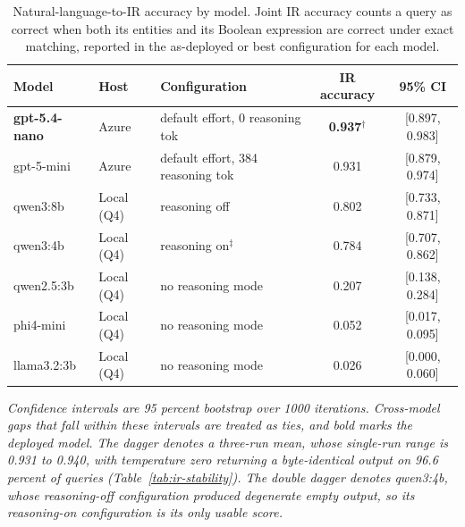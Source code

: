 \begin{table}[H]
\caption{Natural-language-to-IR accuracy by model. Joint IR accuracy counts a query as correct when both its entities and its Boolean expression are correct under exact matching, reported in the as-deployed or best configuration for each model.}
\label{tab:ir-accuracy}
\centering
\footnotesize
\begin{tabular}{@{}lllcc@{}}
\toprule
Model & Host & Configuration & IR accuracy & 95\% CI \\
\midrule
\textbf{gpt-5.4-nano} & Azure & default effort, 0 reasoning tok & \textbf{0.937}$^{\dagger}$ & [0.897, 0.983] \\
gpt-5-mini & Azure & default effort, 384 reasoning tok & 0.931 & [0.879, 0.974] \\
qwen3:8b & Local (Q4) & reasoning off & 0.802 & [0.733, 0.871] \\
qwen3:4b & Local (Q4) & reasoning on$^{\ddagger}$ & 0.784 & [0.707, 0.862] \\
qwen2.5:3b & Local (Q4) & no reasoning mode & 0.207 & [0.138, 0.284] \\
phi4-mini & Local (Q4) & no reasoning mode & 0.052 & [0.017, 0.095] \\
llama3.2:3b & Local (Q4) & no reasoning mode & 0.026 & [0.000, 0.060] \\
\bottomrule
\end{tabular}

\vspace{3pt}
\begin{minipage}{\linewidth}
\footnotesize\itshape
Confidence intervals are 95 percent bootstrap over 1000 iterations. Cross-model gaps that fall within these intervals are treated as ties, and bold marks the deployed model. The dagger denotes a three-run mean, whose single-run range is 0.931 to 0.940, with temperature zero returning a byte-identical output on 96.6 percent of queries (Table~\ref{tab:ir-stability}). The double dagger denotes qwen3:4b, whose reasoning-off configuration produced degenerate empty output, so its reasoning-on configuration is its only usable score.
\end{minipage}
\end{table}

